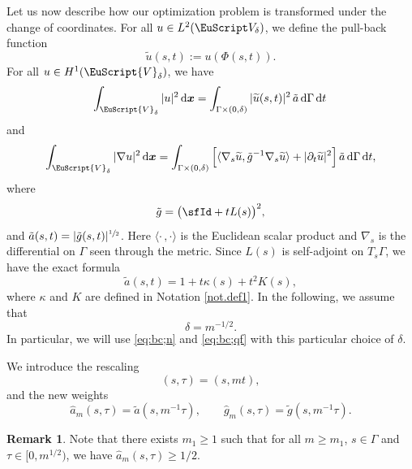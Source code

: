 \documentclass[10pt]{amsart}
\let\mathcal \EuScript
\newcommand{\cV}{\mathcal{V}}
\theoremstyle{plain}
\theoremstyle{definition}
\newtheorem{remark}[theorem]{Remark}
\newcommand{\dx}{\mathrm{\,d}}
\newcommand{\bx}{{\boldsymbol x}}
\begin{document}
Let us now describe how our optimization problem is transformed under the change of coordinates. For all $u\in L^{2}(\mathcal V_{\delta})$, we define the pull-back function
\begin{equation}\label{eq:trans-st}
\widetilde u(s,t):= u(\Phi(s,t)).
\end{equation}
For all $u\in H^{1}(\cV_{\delta})$, we have
\begin{equation}\label{eq:bc;n}
\int_{\cV_{\delta}}|u|^{2}\dx\bx=\int_{\Gamma\times(0,\delta)}|\widetilde u(s,t)|^{2}\,\tilde a\dx \Gamma \dx t\,
\end{equation}
and
\begin{equation}\label{eq:bc;qf}
\int_{\cV_{\delta}}|\nabla u|^{2}\dx\bx= \int_{\Gamma\times(0,\delta)} \Big[\langle\nabla_{s} \widetilde u,\tilde g^{-1}\nabla_{s} \widetilde u\rangle +|\partial_{t}\widetilde u|^{2}\Big]\,\tilde a\dx \Gamma\dx t,
\end{equation}
where
\[\tilde g=\big(\sfId+tL(s)\big)^2,\]
and $\tilde a(s,t)= |\tilde g(s,t)|^{\sfrac{1}{2}}$. Here $\langle\cdot\,,\cdot\rangle$ is the Euclidean scalar product and $\nabla_{s}$ is the differential on $\Gamma$ seen through the metric.
Since
$L(s)$ is self-adjoint on $T_s\Gamma$,
we have the exact formula
\begin{equation}\label{eq.Taylor3}
\tilde{a}(s,t) = 1+t\kappa(s) + t^2K(s),
\end{equation}
where $\kappa$ and $K$ are defined in Notation \ref{not.def1}. In the following, we assume that
\begin{equation}\label{eq:depdeltam}
\delta = m^{-1/2}.
\end{equation}
In particular, we will use \eqref{eq:bc;n} and \eqref{eq:bc;qf} with this particular choice of $\delta$.

\label{sec.rescaled}

We introduce the rescaling
\[(s,\tau)=(s,mt),\]
and the new weights
\begin{equation}\label{eq:Jac-a'}
\widehat a_m(s,\tau)=\tilde a(s,m^{-1}\tau),\qquad \widehat g_m(s,\tau)=\tilde g(s,m^{-1}\tau).
\end{equation}

\begin{remark}\label{rem.m1}
Note that there exists $m_1\geq1$ such that for all $m\geq m_1$, $s\in \Gamma$ and $\tau\in[0,m^{1/2})$, we have $\widehat a_m(s,\tau)\geq 1/2$.
\end{remark}
\end{document}
